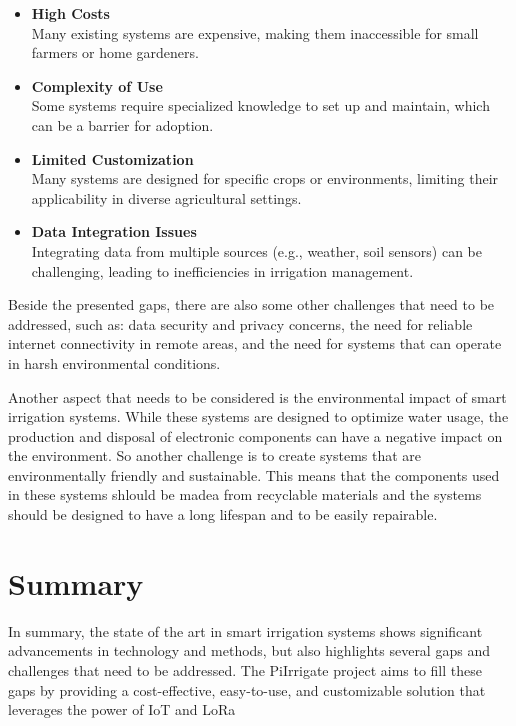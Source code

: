 \begin{itemize}
  \item \textbf{High Costs} \\
  Many existing systems are expensive, making them inaccessible for small farmers or home gardeners.
  
  \item \textbf{Complexity of Use} \\
  Some systems require specialized knowledge to set up and maintain, which can be a barrier for adoption.

  \item \textbf{Limited Customization} \\
  Many systems are designed for specific crops or environments, limiting their applicability in diverse agricultural settings.

  \item \textbf{Data Integration Issues} \\
  Integrating data from multiple sources (e.g., weather, soil sensors) can be challenging, leading to inefficiencies in irrigation management.
\end{itemize}

Beside the presented gaps, there are also some other challenges that need to be addressed, such as:
data security and privacy concerns, the need for reliable internet connectivity in remote areas, 
and the need for systems that can operate in harsh environmental conditions. 

Another aspect that needs to be considered is the environmental impact of smart irrigation systems.
While these systems are designed to optimize water usage,
the production and disposal of electronic components can have a negative impact on the environment.
So another challenge is to create systems that are environmentally friendly and sustainable. This means 
that the components used in these systems shlould be madea from recyclable materials 
and the systems should be designed to have a long lifespan and to be easily repairable.

\section{Summary}
In summary, the state of the art in smart irrigation systems shows significant 
advancements in technology and methods, but also highlights several gaps and challenges 
that need to be addressed. The PiIrrigate project aims to fill these gaps by providing a
cost-effective, easy-to-use, and customizable solution that leverages the power of IoT and LoRa 